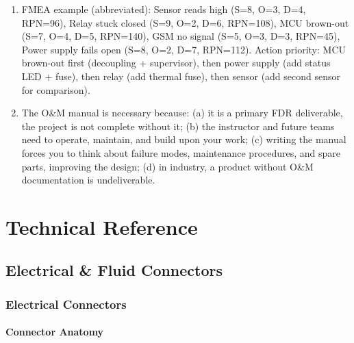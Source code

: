 \documentclass[11pt,letterpaper,twoside,openany]{book}
\begin{document}
\begin{enumerate}[leftmargin=1.5em]
\item FMEA example (abbreviated): Sensor reads high (S=8, O=3, D=4, RPN=96), Relay stuck closed (S=9, O=2, D=6, RPN=108), MCU brown-out (S=7, O=4, D=5, RPN=140), GSM no signal (S=5, O=3, D=3, RPN=45), Power supply fails open (S=8, O=2, D=7, RPN=112). Action priority: MCU brown-out first (decoupling + supervisor), then power supply (add status LED + fuse), then relay (add thermal fuse), then sensor (add second sensor for comparison).
\item The O\&M manual is necessary because: (a) it is a primary FDR deliverable, the project is not complete without it; (b) the instructor and future teams need to operate, maintain, and build upon your work; (c) writing the manual forces you to think about failure modes, maintenance procedures, and spare parts, improving the design; (d) in industry, a product without O\&M documentation is undeliverable.
\end{enumerate}



\part{Technical Reference}

\chapter{Electrical \& Fluid Connectors}



\vspace{1em}




\vspace{1em}

\section{Electrical Connectors}

\subsection{Connector Anatomy}
\end{document}

